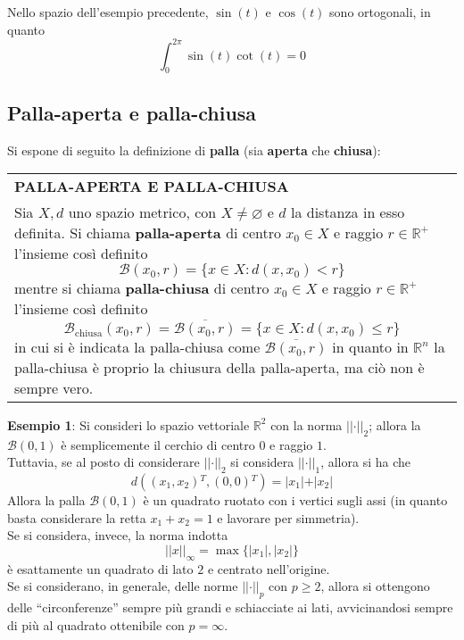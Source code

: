 \documentclass[a4paper]{extarticle}
\newcommand{\quotes}[1]{``#1''}
\renewcommand\arraystretch{}
\begin{document}
\vspace{1em}
\noindent
Nello spazio dell'esempio precedente, $\sin(t)$ e $\cos(t)$ sono ortogonali, in quanto
\[\int_0^{2\pi} \sin(t) \cot(t) = 0\]

\vspace{1em}
\subsection{Palla-aperta e palla-chiusa}
Si espone di seguito la definizione di \textbf{palla} (sia \textbf{aperta} che \textbf{chiusa}):

\vspace{1em}
\setlength{\tabcolsep}{14pt}
\renewcommand{\arraystretch}{2}
\noindent
\begin{tabularx}{\textwidth}{@{}|P|@{}}
    \hline
    {\textbf{PALLA-APERTA E PALLA-CHIUSA}}\\
    \parbox{\linewidth}{Sia $X,d$ uno spazio metrico, con $X \neq \varnothing$ e $d$ la distanza in esso definita.\\
    Si chiama \textbf{palla-aperta} di centro $x_0 \in X$ e raggio $r \in \mathbb{R}^+$ l'insieme così definito
    \[\mathcal{B}(x_0,r) = \{x \in X : d(x,x_0) < r\}\]
    mentre si chiama \textbf{palla-chiusa} di centro $x_0 \in X$ e raggio $r \in \mathbb{R}^+$ l'insieme così definito
    \[\mathcal{B}_\text{chiusa}(x_0,r) = \overline{\mathcal{B}(x_0,r)} = \{x \in X : d(x,x_0) \leq r\}\]
    in cui si è indicata la palla-chiusa come $\overline{\mathcal{B}(x_0,r)}$ in quanto in $\mathbb{R}^n$ la palla-chiusa è proprio la chiusura della palla-aperta, ma ciò non è sempre vero.
    \vspace{3mm}}\\
    \hline
\end{tabularx}

\vspace{1em}
\noindent
\textbf{Esempio 1}: Si consideri lo spazio vettoriale $\mathbb{R}^2$ con la norma $\vert \vert \cdot \vert \vert_2$; allora la $\mathcal{B}(0,1)$ è semplicemente il cerchio di centro $0$ e raggio $1$.\\
Tuttavia, se al posto di considerare $\vert \vert \cdot \vert \vert_2$ si considera $\vert \vert \cdot \vert \vert_1$, allora si ha che
\[d((x_1,x_2){^T},(0,0){^T}) = \vert x_1 \vert + \vert x_2 \vert\]
Allora la palla $\mathcal{B}(0,1)$ è un quadrato ruotato con i vertici sugli assi (in quanto basta considerare la retta $x_1+x_2=1$ e lavorare per simmetria).\\
Se si considera, invece, la norma indotta
\[\vert \vert x \vert \vert_\infty = \max\{\vert x_1 \vert, \vert x_2 \vert\}\]
è esattamente un quadrato di lato $2$ e centrato nell'origine.\\
Se si considerano, in generale, delle norme $\vert \vert \cdot \vert \vert_p$ con $p \geq 2$, allora si ottengono delle \quotes{circonferenze} sempre più grandi e schiacciate ai lati, avvicinandosi sempre di più al quadrato ottenibile con $p=\infty$. 
\end{document}
